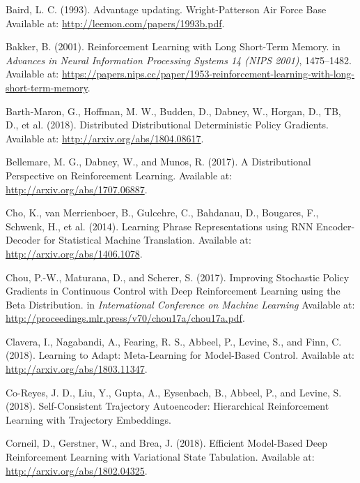 \documentclass[
  letterpaper,
  DIV=11,
  numbers=noendperiod]{scrreprt}
\newlength{\cslhangindent}
\newlength{\cslentryspacingunit} %
\newenvironment{CSLReferences}[2] %
 {%
  \setlength{\parindent}{0pt}
  \ifodd #1
  \let\oldpar\par
  \def\par{\hangindent=\cslhangindent\oldpar}
  \fi
  \setlength{\parskip}{#2\cslentryspacingunit}
 }%
 {}
\begin{document}
\begin{CSLReferences}{1}{0}
\leavevmode{}%
Baird, L. C. (1993). Advantage updating. {Wright-Patterson Air Force
Base} Available at: \url{http://leemon.com/papers/1993b.pdf}.

\leavevmode{}%
Bakker, B. (2001). Reinforcement {Learning} with {Long Short-Term
Memory}. in \emph{Advances in {Neural Information Processing Systems} 14
({NIPS} 2001)}, 1475--1482. Available at:
\url{https://papers.nips.cc/paper/1953-reinforcement-learning-with-long-short-term-memory}.

\leavevmode{}%
Barth-Maron, G., Hoffman, M. W., Budden, D., Dabney, W., Horgan, D., TB,
D., et al. (2018). Distributed {Distributional Deterministic Policy
Gradients}. Available at: \url{http://arxiv.org/abs/1804.08617}.

\leavevmode{}%
Bellemare, M. G., Dabney, W., and Munos, R. (2017). A {Distributional
Perspective} on {Reinforcement Learning}. Available at:
\url{http://arxiv.org/abs/1707.06887}.

\leavevmode{}%
Cho, K., van Merrienboer, B., Gulcehre, C., Bahdanau, D., Bougares, F.,
Schwenk, H., et al. (2014). Learning {Phrase Representations} using {RNN
Encoder-Decoder} for {Statistical Machine Translation}. Available at:
\url{http://arxiv.org/abs/1406.1078}.

\leavevmode{}%
Chou, P.-W., Maturana, D., and Scherer, S. (2017). Improving {Stochastic
Policy Gradients} in {Continuous Control} with {Deep Reinforcement
Learning} using the {Beta Distribution}. in \emph{International
{Conference} on {Machine Learning}} Available at:
\url{http://proceedings.mlr.press/v70/chou17a/chou17a.pdf}.

\leavevmode{}%
Clavera, I., Nagabandi, A., Fearing, R. S., Abbeel, P., Levine, S., and
Finn, C. (2018). Learning to {Adapt}: {Meta-Learning} for {Model-Based
Control}. Available at: \url{http://arxiv.org/abs/1803.11347}.

\leavevmode{}%
Co-Reyes, J. D., Liu, Y., Gupta, A., Eysenbach, B., Abbeel, P., and
Levine, S. (2018). Self-{Consistent Trajectory Autoencoder}:
{Hierarchical Reinforcement Learning} with {Trajectory Embeddings}.

\leavevmode{}%
Corneil, D., Gerstner, W., and Brea, J. (2018). Efficient {Model-Based
Deep Reinforcement Learning} with {Variational State Tabulation}.
Available at: \url{http://arxiv.org/abs/1802.04325}.


\end{CSLReferences}
\end{document}

